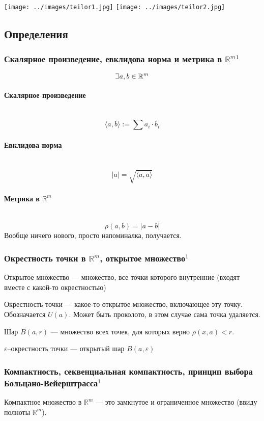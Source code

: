 \documentclass{article}
\def\letus{%
\mathord{\setbox0=\hbox{$\exists$}%
         \hbox{\kern 0.125\wd0%
               \vbox to \ht0{%
                  \hrule width 0.75\wd0%
                  \vfill%
                  \hrule width 0.75\wd0}%
               \vrule height \ht0%
               \kern 0.125\wd0}%
       }%
        }
\let\vanillaparagraph\paragraph
\renewcommand{\paragraph}[1]{\vanillaparagraph{#1}\mbox{}\\}
\begin{document}
\texttt{[image: ../images/teilor1.jpg]}
\texttt{[image: ../images/teilor2.jpg]}

\newpage
\subsection{Определения}

\subsubsection{Скалярное произведение, евклидова норма и метрика в \texorpdfstring{$\mathbb{R}^m$}{R\^m}\texorpdfstring{$^1$}{}}
$$
\letus a, b \in \mathbb{R}^m
$$
\paragraph{Скалярное произведение}
$$
\langle a, b \rangle := \sum a_i \cdot b_i
$$

\paragraph{Евклидова норма}
$$
|a| = \sqrt{\langle a, a\rangle}
$$

\paragraph{Метрика в \texorpdfstring{$\mathbb{R}^m$}{R\^m}}
$$
\rho(a, b) = |a - b|
$$
Вообще ничего нового, просто напоминалка, получается. 

\subsubsection{Окрестность точки в \texorpdfstring{$\mathbb{R}^m$}{R\^m}, открытое множество\texorpdfstring{$^1$}{}}
Открытое множество --- множество, все точки которого внутренние (входят вместе с какой-то окрестностью)

Окрестность точки --- какое-то открытое множество, включающее эту точку. Обозначается $U(a)$. Может быть проколото, в этом случае сама точка удаляется. 

Шар $B(a, r)$ --- множество всех точек, для которых верно $\rho(x, a) < r$.

$\varepsilon$--окрестность точки --- открытый шар $B(a, \varepsilon)$

\subsubsection{Компактность, секвенциальная компактность, принцип выбора Больцано-Вейерштрасса\texorpdfstring{$^1$}{}}
Компактное множество в $\mathbb{R}^m$ --- это замкнутое и ограниченное множество (ввиду полноты $\mathbb{R}^m$).
\end{document}
